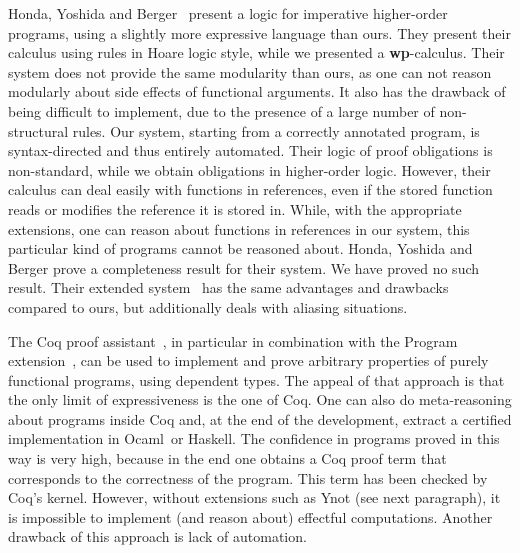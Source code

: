 \documentclass[a4paper]{llncs}
\newcommand{\wpre}{{\bf wp}}
\newcommand{\ocaml}{Ocaml}
\begin{document}
Honda, Yoshida and Berger~\cite{Honda05anobservationally} present a
logic for imperative higher-order programs, using a slightly more
expressive language than ours. They present their calculus using rules
in Hoare logic style, while we presented a \wpre-calculus. Their
system does not provide the same modularity than ours, as one can not
reason modularly about side effects of functional arguments. It also
has the drawback of being difficult to implement, due to the presence
of a large number of non-structural rules. Our system, starting from a
correctly annotated program, is syntax-directed and thus entirely
automated. Their logic of proof obligations is non-standard, while we
obtain obligations in higher-order logic. However, their calculus can
deal easily with functions in references, even if the stored function
reads or modifies the reference it is stored in. While, with the
appropriate extensions, one can reason about functions in references
in our system, this particular kind of programs cannot be reasoned
about. Honda, Yoshida and Berger prove a completeness result for their
system. We have proved no such result. Their extended
system~\cite{BergerHondaYoshida05aliasing} has the same advantages and
drawbacks compared to ours, but additionally deals with aliasing
situations.

The Coq proof assistant~\cite{CoqManualV81}, in particular in
combination with the Program extension~\cite{sozeau07icfp}, can be
used to implement and prove arbitrary properties of purely functional
programs, using dependent types. The appeal of that approach is that
the only limit of expressiveness is the one of Coq. One can also do
meta-reasoning about programs inside Coq and, at the end of the
development, extract a certified implementation in \ocaml\ or
Haskell. The confidence in programs proved in this way is very high,
because in the end one obtains a Coq proof term that corresponds to
the correctness of the program. This term has been checked by Coq's
kernel. However, without extensions such as Ynot (see next paragraph),
it is impossible to implement (and reason about) effectful
computations. Another drawback of this approach is lack of automation.
\end{document}
